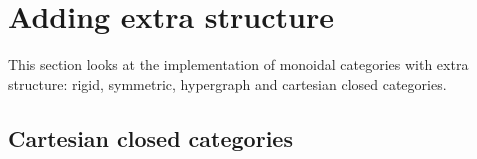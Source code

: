 
\section{Adding extra structure} \label{section:extra structure}

This section looks at the implementation of monoidal categories with extra structure: rigid, symmetric, hypergraph and cartesian closed categories.

\subsection{Cartesian closed categories}
